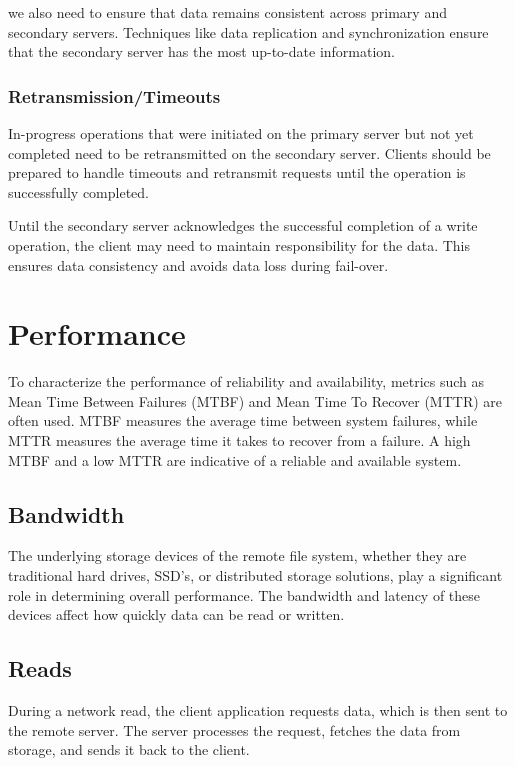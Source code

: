 \documentclass{report}
\newcommand{\corollaryBegin}[1]{\begin{tcolorbox}[colback=teal!5!white,colframe=black!75!teal,title={Corollary:
      #1}]}
\newcommand{\corollaryEnd}{\end{tcolorbox}}
\begin{document}
\corollaryBegin{Data Consistency}
we also need to ensure that data remains consistent across primary and secondary servers. Techniques
like data replication and synchronization ensure that the secondary server has the most up-to-date
information.
\corollaryEnd


\subsubsection{Retransmission/Timeouts}
In-progress operations that were initiated on the primary server but not yet completed need to be
retransmitted on the secondary server. Clients should be prepared to handle timeouts and retransmit
requests until the operation is successfully completed. 

\corollaryBegin{Responsibility}
Until the secondary server acknowledges the successful completion of a write operation, the client
may need to maintain responsibility for the data. This ensures data consistency and avoids data loss
during fail-over.
\corollaryEnd





\section{Performance}
To characterize the performance of reliability and availability, metrics such as Mean Time Between
Failures (MTBF) and Mean Time To Recover (MTTR) are often used. MTBF measures the average time
between system failures, while MTTR measures the average time it takes to recover from a failure. A
high MTBF and a low MTTR are indicative of a reliable and available system. 

\subsection{Bandwidth}
The underlying storage devices of the remote file system, whether they are traditional hard drives,
SSD's, or distributed storage solutions, play a significant role in determining overall
performance. The bandwidth and latency of these devices affect how quickly data can be read or
written. 


\subsection{Reads}
During a network read, the client application requests data, which is then sent to the remote
server. The server processes the request, fetches the data from storage, and sends it back to the
client.
\end{document}
